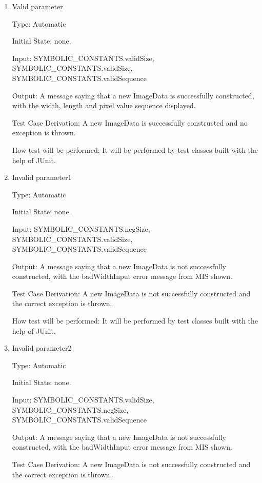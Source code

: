 \documentclass[12pt, titlepage]{article}
\begin{document}
\begin{enumerate}

\item{Valid parameter\\}

Type: Automatic
					
Initial State: none.
					
Input: SYMBOLIC\_CONSTANTS.validSize, SYMBOLIC\_CONSTANTS.validSize,
SYMBOLIC\_CONSTANTS.validSequence
					
Output: A message saying that a new ImageData is successfully constructed, with
the width, length and pixel value sequence displayed.

Test Case Derivation: A new ImageData is successfully constructed and no
exception is thrown.

How test will be performed: It will be performed by test classes built with the
help of JUnit.
					
\item{Invalid parameter1\\}

Type: Automatic
					
Initial State: none.
					
Input: SYMBOLIC\_CONSTANTS.negSize, SYMBOLIC\_CONSTANTS.validSize,
SYMBOLIC\_CONSTANTS.validSequence
					
Output: A message saying that a new ImageData is not successfully constructed,
with the badWidthInput error message from MIS shown.

Test Case Derivation: A new ImageData is not successfully constructed and the
correct exception is thrown.

How test will be performed: It will be performed by test classes built with the
help of JUnit.

\item{Invalid parameter2\\}

Type: Automatic
					
Initial State: none.
					
Input: SYMBOLIC\_CONSTANTS.validSize, SYMBOLIC\_CONSTANTS.negSize,
SYMBOLIC\_CONSTANTS.validSequence
					
Output: A message saying that a new ImageData is not successfully constructed,
with the badWidthInput error message from MIS shown.

Test Case Derivation: A new ImageData is not successfully constructed and the
correct exception is thrown.


\end{enumerate}
\end{document}
